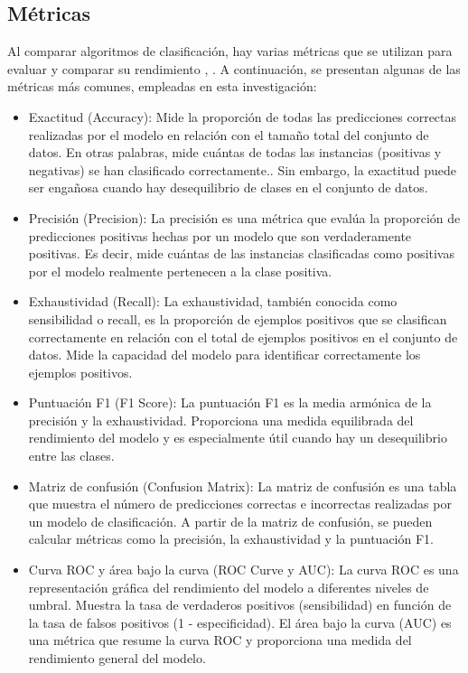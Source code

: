 \subsection{Métricas}
Al comparar algoritmos de clasificación, hay varias métricas que se utilizan para evaluar y comparar su rendimiento \citep{geron2022hands}, \citep{hastie2009elements}. A continuación, se presentan algunas de las métricas más comunes, empleadas en esta investigación:
\begin{itemize}
	\item Exactitud (Accuracy): Mide la proporción de todas las predicciones correctas realizadas por el modelo en relación con el tamaño total del conjunto de datos. En otras palabras, mide cuántas de todas las instancias (positivas y negativas) se han clasificado correctamente.. Sin embargo, la exactitud puede ser engañosa cuando hay desequilibrio de clases en el conjunto de datos.
	\item Precisión (Precision): La precisión es una métrica que evalúa la proporción de predicciones positivas hechas por un modelo que son verdaderamente positivas. Es decir, mide cuántas de las instancias clasificadas como positivas por el modelo realmente pertenecen a la clase positiva. 
	\item Exhaustividad (Recall): La exhaustividad, también conocida como sensibilidad o recall, es la proporción de ejemplos positivos que se clasifican correctamente en relación con el total de ejemplos positivos en el conjunto de datos. Mide la capacidad del modelo para identificar correctamente los ejemplos positivos.
	\item Puntuación F1 (F1 Score): La puntuación F1 es la media armónica de la precisión y la exhaustividad. Proporciona una medida equilibrada del rendimiento del modelo y es especialmente útil cuando hay un desequilibrio entre las clases.
	\item Matriz de confusión (Confusion Matrix): La matriz de confusión es una tabla que muestra el número de predicciones correctas e incorrectas realizadas por un modelo de clasificación. A partir de la matriz de confusión, se pueden calcular métricas como la precisión, la exhaustividad y la puntuación F1.
	\item Curva ROC y área bajo la curva (ROC Curve y AUC): La curva ROC es una representación gráfica del rendimiento del modelo a diferentes niveles de umbral. Muestra la tasa de verdaderos positivos (sensibilidad) en función de la tasa de falsos positivos (1 - especificidad). El área bajo la curva (AUC) es una métrica que resume la curva ROC y proporciona una medida del rendimiento general del modelo.
\end{itemize}

